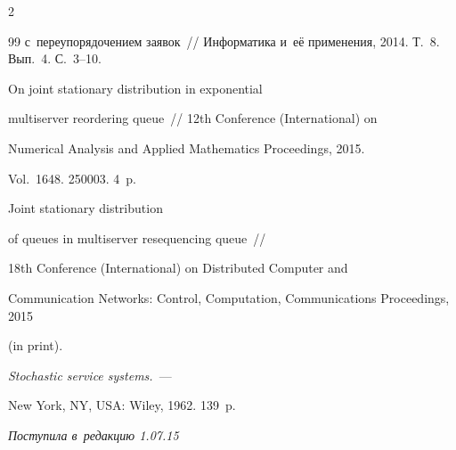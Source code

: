 \begin{multicols}{2}
{{\begin{thebibliography}{99}
с~переупорядочением заявок~// Информатика и~её применения, 2014. Т.~8. Вып.~4. С.~3--10.









On joint stationary distribution in exponential


multiserver reordering queue~// 12th  Conference (International) on


Numerical Analysis and Applied Mathematics Proceedings, 2015. 


Vol.~1648. 250003. 4~p.







 Joint stationary distribution


of queues in multiserver resequencing queue~// 


18th  Conference (International) on Distributed Computer and


Communication Networks: Control, Computation, Communications Proceedings, 2015


(in print).







 \textit{Stochastic service systems.}~--- 


New York, NY, USA: Wiley, 1962. 139~p.


 \end{thebibliography}





 }


 }





\end{multicols}





\vspace*{-3pt}





\hfill{\small\textit{Поступила в~редакцию 1.07.15}}










